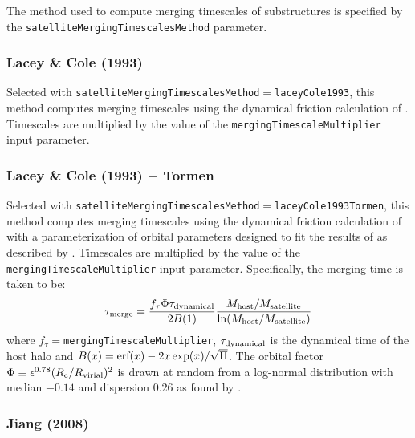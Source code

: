 The method used to compute merging timescales of substructures is specified by the {\tt satelliteMergingTimescalesMethod} parameter.

\subsubsection{Lacey \& Cole (1993)}

Selected with {\tt satelliteMergingTimescalesMethod}$=${\tt laceyCole1993}, this method computes merging timescales using the dynamical friction calculation of \cite{lacey_merger_1993}. Timescales are multiplied by the value of the {\tt mergingTimescaleMultiplier} input parameter.

\subsubsection{Lacey \& Cole (1993) $+$ Tormen}

Selected with {\tt satelliteMergingTimescalesMethod}$=${\tt laceyCole1993Tormen}, this method computes merging timescales using the dynamical friction calculation of \cite{lacey_merger_1993} with a parameterization of orbital parameters designed to fit the results of \cite{tormen_rise_1997} as described by \cite{cole_hierarchical_2000}. Timescales are multiplied by the value of the {\tt mergingTimescaleMultiplier} input parameter. Specifically, the merging time is taken to be:
\begin{equation}
 \tau_{\rm merge} = {f_\tau \Phi \tau_{\rm dynamical} \over 2 B(1)} { M_{\rm host}/M_{\rm satellite} \over \ln (M_{\rm host}/M_{\rm satellite})}
\end{equation}
where $f_\tau=${\tt mergingTimescaleMultiplier}, $\tau_{\rm dynamical}$ is the dynamical time of the host halo and $B(x)=\hbox{erf}(x)-2 x \exp(x)/\sqrt{\Pi}$. The orbital factor $\Phi \equiv \epsilon^{0.78} (R_{\rm c}/R_{\rm virial})^2$ is drawn at random from a log-normal distribution with median $-0.14$ and dispersion $0.26$ as found by \cite{cole_hierarchical_2000}.

\subsubsection{Jiang (2008)}\label{sec:DynamicalFrictionJiang2008}

